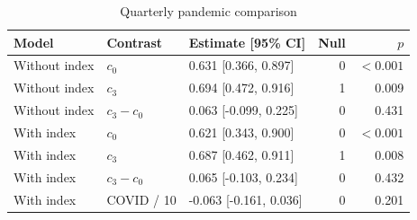 \begin{table}[htbp]\centering\setlength{\tabcolsep}{4pt}\small
\caption{Quarterly pandemic comparison}\label{tab:si_dynamic_covid}
\begin{tabular}{@{}lllrr@{}}\toprule
Model & Contrast & Estimate [95\% CI] & Null & $p$\\\midrule
Without index & $c_0$ & 0.631 [0.366, 0.897] & 0 & $<0.001$\\
Without index & $c_3$ & 0.694 [0.472, 0.916] & 1 & 0.009\\
Without index & $c_3-c_0$ & 0.063 [-0.099, 0.225] & 0 & 0.431\\
With index & $c_0$ & 0.621 [0.343, 0.900] & 0 & $<0.001$\\
With index & $c_3$ & 0.687 [0.462, 0.911] & 1 & 0.008\\
With index & $c_3-c_0$ & 0.065 [-0.103, 0.234] & 0 & 0.432\\
With index & COVID / 10 & -0.063 [-0.161, 0.036] & 0 & 0.201\\
\bottomrule\end{tabular}
\end{table}

